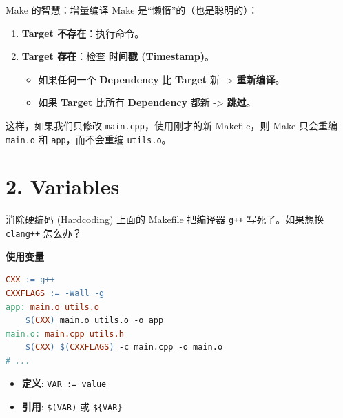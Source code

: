 \documentclass[aspectratio=169,10pt]{beamer}
\begin{document}
\begin{frame}[fragile,shrink=12]{Make 的智慧：增量编译}
\footnotesize
Make 是``懒惰''的（也是聪明的）：

\begin{enumerate}
\def\labelenumi{\arabic{enumi}.}
\item
  \textbf{Target 不存在}：执行命令。
\item
  \textbf{Target 存在}：检查 \textbf{时间戳 (Timestamp)}。

  \begin{itemize}
  \item
    如果任何一个 \textbf{Dependency} 比 \textbf{Target} 新 -\textgreater{} \textbf{重新编译}。
  \item
    如果 \textbf{Target} 比所有 \textbf{Dependency} 都新 -\textgreater{} \textbf{跳过}。
  \end{itemize}
\end{enumerate}

这样，如果我们只修改 \texttt{main.cpp}，使用刚才的新 Makefile，则 Make 只会重编 \texttt{main.o} 和 \texttt{app}，而不会重编 \texttt{utils.o}。
\end{frame}

\section{2. Variables}

\begin{frame}[fragile,shrink=12]{消除硬编码 (Hardcoding)}
\footnotesize
上面的 Makefile 把编译器 \texttt{g++} 写死了。如果想换 \texttt{clang++} 怎么办？

\textbf{使用变量}

\begin{lstlisting}[language=make]
CXX := g++
CXXFLAGS := -Wall -g
app: main.o utils.o
    $(CXX) main.o utils.o -o app
main.o: main.cpp utils.h
    $(CXX) $(CXXFLAGS) -c main.cpp -o main.o
# ...
\end{lstlisting}

\begin{itemize}
\item
  \textbf{定义}: \texttt{VAR\ :=\ value}
\item
  \textbf{引用}: \texttt{\$(VAR)} 或 \texttt{\$\{VAR\}}
\end{itemize}
\end{frame}
\end{document}
